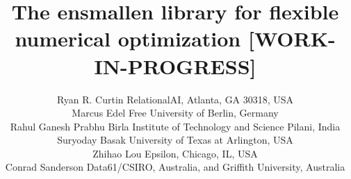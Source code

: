 \documentclass[twoside,11pt]{article}
\begin{document}
\title{\small The ensmallen library for flexible numerical optimization [WORK-IN-PROGRESS]}

\author{%
  \name Ryan R. Curtin \hfill \addr RelationalAI, Atlanta, GA 30318, USA\\
  \name Marcus Edel \hfill \addr Free University of Berlin, Germany\\
  \name Rahul Ganesh Prabhu \hfill \addr Birla Institute of Technology and Science Pilani, India\\
  \name Suryoday Basak \hfill \addr University of Texas at Arlington, USA\\
  \name Zhihao Lou \hfill \addr Epsilon, Chicago, IL, USA\\
  \name Conrad Sanderson \hfill \addr Data61/CSIRO, Australia, and Griffith University, Australia%
  }



\maketitle
\end{document}
